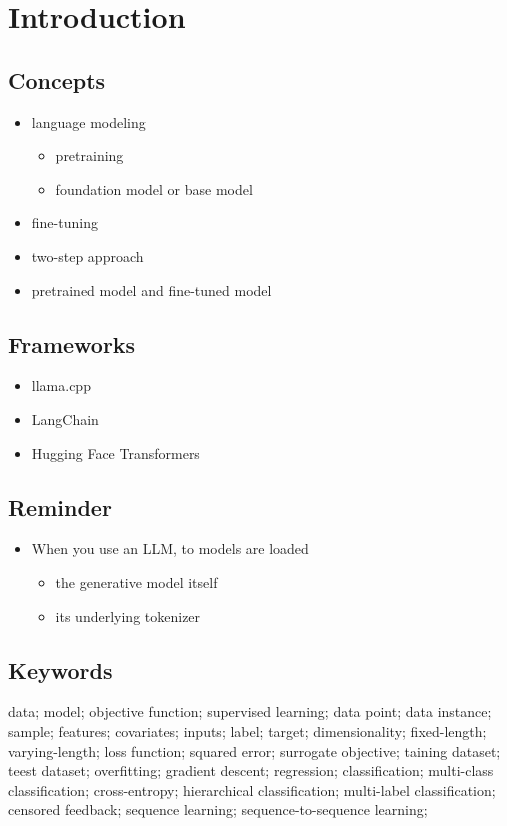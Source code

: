 \documentclass[letterpaper, oneside]{book}
\theoremstyle{definition}
\theoremstyle{remark}
\begin{document}
\tableofcontents

\chapter{Introduction}

\section{Concepts}

\begin{itemize}
	\item language modeling
		\begin{itemize}
			\item pretraining
			\item foundation model or base model
		\end{itemize}	
		
	\item fine-tuning
	\item two-step approach
	\item pretrained model and fine-tuned model
\end{itemize}


\section{Frameworks}

\begin{itemize}
	\item llama.cpp
	\item LangChain
	\item Hugging Face Transformers
\end{itemize}

\section{Reminder}

\begin{itemize}
	\item When you use an LLM, to models are loaded
		\begin{itemize}
			\item the generative model itself
			\item its underlying tokenizer
		\end{itemize}
\end{itemize}


\section{Keywords}
data; model; objective function; supervised learning; data point; data instance; sample; 
features; covariates; inputs; label; target; dimensionality; fixed-length; varying-length; loss function; squared error; surrogate objective; taining dataset; teest dataset; overfitting; gradient descent; regression; classification; multi-class classification; cross-entropy; hierarchical classification; multi-label classification; censored feedback; sequence learning; sequence-to-sequence learning;
\end{document}
